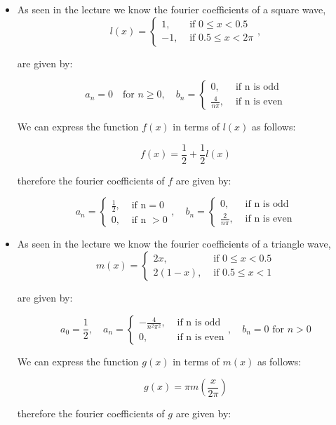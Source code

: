 \documentclass[11pt]{article}
\begin{document}
\begin{solution}     
\begin{itemize}
\item As seen in the lecture we know the fourier coefficients of a square wave,
 $$
l(x)= \begin{cases}1, & \text { if } 0 \leq x<0.5 \\ -1, & \text { if } 0.5 \leq x<2 \pi\end{cases},
$$

are given by:

$$
a_n = 0\quad \text{for } n \geq 0, \quad b_n = \begin{cases}0, & \text { if n is odd} \\ \frac{4}{n\pi}, & \text{ if n is even}\end{cases}
$$

We can express the function $f(x)$ in terms of $l(x)$ as follows:

$$
f(x) = \frac{1}{2} + \frac{1}{2}l(x)
$$

therefore the fourier coefficients of $f$ are given by:

$$
a_n = \begin{cases}\frac{1}{2}, & \text { if n} = 0 \\0,& \text{ if n }>0\end{cases}, \quad b_n = \begin{cases}0, & \text { if n is odd} \\ \frac{2}{n\pi}, & \text{ if n is even}\end{cases}
$$
\item  As seen in the lecture we know the fourier coefficients of a triangle wave,
$$
m(x)= \begin{cases}2 x, & \text { if } 0 \leq x<0.5 \\ 2(1-x), & \text { if } 0.5 \leq x<1\end{cases}
$$

are given by:

$$
a_0 = \frac{1}{2}, \quad a_n = \begin{cases}-\frac{4}{n^2\pi^2}, & \text { if n is odd} \\ 0, & \text{ if n is even}\end{cases}, \quad b_n = 0 \text{ for } n > 0
$$

We can express the function $g(x)$ in terms of $m(x)$ as follows:

$$
g(x) = \pi m(\frac{x}{2\pi})
$$

therefore the fourier coefficients of $g$ are given by:


\end{itemize}
\end{solution}
\end{document}
